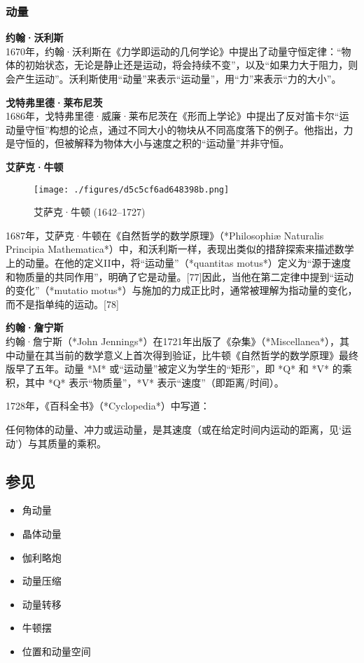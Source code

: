 \subsubsection{动量}  
\textbf{约翰·沃利斯}\\  
1670年，约翰·沃利斯在《力学即运动的几何学论》中提出了动量守恒定律：“物体的初始状态，无论是静止还是运动，将会持续不变”，以及“如果力大于阻力，则会产生运动”。沃利斯使用“动量”来表示“运动量”，用“力”来表示“力的大小”。  

\textbf{戈特弗里德·莱布尼茨}\\  
1686年，戈特弗里德·威廉·莱布尼茨在《形而上学论》中提出了反对笛卡尔“运动量守恒”构想的论点，通过不同大小的物块从不同高度落下的例子。他指出，力是守恒的，但被解释为物体大小与速度之积的“运动量”并非守恒。

\textbf{艾萨克·牛顿}\\  
\begin{figure}[ht]
\centering
\texttt{[image: ./figures/d5c5cf6ad648398b.png]}
\caption{艾萨克·牛顿   (1642–1727)} \label{fig_DL_8}
\end{figure}
1687年，艾萨克·牛顿在《自然哲学的数学原理》（*Philosophiæ Naturalis Principia Mathematica*）中，和沃利斯一样，表现出类似的措辞探索来描述数学上的动量。在他的定义II中，将“运动量”（*quantitas motus*）定义为“源于速度和物质量的共同作用”，明确了它是动量。[77]因此，当他在第二定律中提到“运动的变化”（*mutatio motus*）与施加的力成正比时，通常被理解为指动量的变化，而不是指单纯的运动。[78]

\textbf{约翰·詹宁斯}\\
约翰·詹宁斯（*John Jennings*）在1721年出版了《杂集》（*Miscellanea*），其中动量在其当前的数学意义上首次得到验证，比牛顿《自然哲学的数学原理》最终版早了五年。动量 *M* 或“运动量”被定义为学生的“矩形”，即 *Q* 和 *V* 的乘积，其中 *Q* 表示“物质量”，*V* 表示“速度”（即距离/时间）。

1728年，《百科全书》（*Cyclopedia*）中写道：

任何物体的动量、冲力或运动量，是其速度（或在给定时间内运动的距离，见‘运动’）与其质量的乘积。
\subsection{参见}
\begin{itemize}
\item 角动量
\item 晶体动量
\item 伽利略炮
\item 动量压缩
\item 动量转移
\item 牛顿摆
\item 位置和动量空间
\end{itemize}
